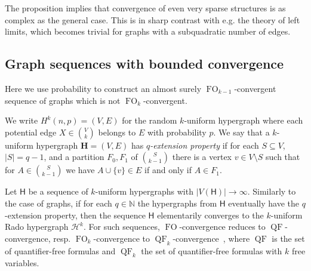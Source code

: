 \documentclass[11pt]{article}
\theoremstyle{plain}
\theoremstyle{definition}
\theoremstyle{remark}
\newcommand{\N}{\mathbb{N}}
\DeclareMathOperator\FO{FO}
\DeclareMathOperator\QF{QF}
\newcommand{\str}[1]{\mathbf{#1}}
\newcommand{\strseq}[1]{{\boldsymbol{\mathsf{#1}}}}
\begin{document}
The proposition implies that convergence of even very sparse structures is as complex as the general case.
This is in sharp contrast with e.g. the theory of left limits, which becomes trivial for graphs with a subquadratic number of edges.

\subsection{Graph sequences with bounded convergence}\label{ssec:bounded_convergence}

Here we use probability to construct an almost surely $\FO_{k-1}$-convergent sequence of graphs which is not $\FO_k$-convergent.

We write $H^k(n,p) = (V, E)$ for the random $k$-uniform hypergraph where each potential edge $X \in \binom{V}{k}$ belongs to $E$ with probability $p$.
We say that a $k$-uniform hypergraph $\str{H} = (V, E)$ has \emph{$q$-extension property} if for each $S \subseteq V$, $|S| = q-1$, and a partition $F_0, F_1$ of $\binom{S}{k-1}$ there is a vertex $v \in V \setminus S$ such that for $A \in \binom{S}{k-1}$ we have $A \cup \{v\} \in E$ if and only if $A \in F_1$.

Let $\strseq{H}$ be a sequence of $k$-uniform hypergraphs with $|V(\strseq{H})| \to \infty$.
Similarly to the case of graphs, if for each $q \in \N$ the hypergraphs from $\strseq{H}$ eventually have the $q$-extension property, then the sequence $\strseq{H}$ elementarily converges to the $k$-uniform Rado hypergraph $\mathcal{H}^k$.
For such sequences, $\FO$-convergence reduces to $\QF$-convergence, resp. $\FO_k$-convergence to $\QF_k$-convergence~\cite[Lemma~2.28]{unified_approach}, where $\QF$ is the set of quantifier-free formulas and $\QF_k$ the set of quantifier-free formulas with $k$ free variables.
\end{document}
